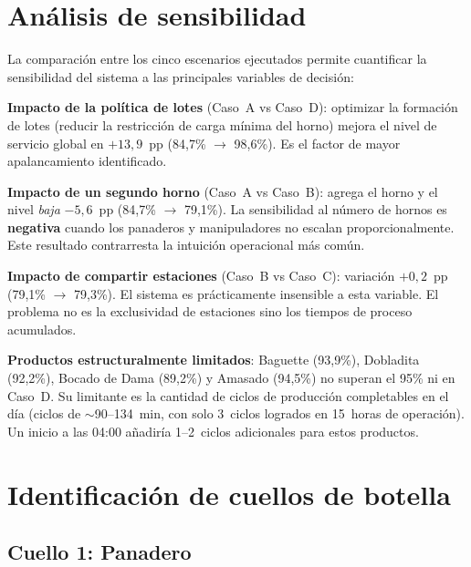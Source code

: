 \documentclass[12pt]{article}
\begin{document}
\newpage
\section{Análisis de sensibilidad}

La comparación entre los cinco escenarios ejecutados permite cuantificar la sensibilidad del sistema a las principales variables de decisión:

\medskip
\noindent\textbf{Impacto de la política de lotes} (Caso~A vs Caso~D): optimizar la formación de lotes (reducir la restricción de carga mínima del horno) mejora el nivel de servicio global en $+13,9$~pp (84,7\% $\to$ 98,6\%). Es el factor de mayor apalancamiento identificado.

\medskip
\noindent\textbf{Impacto de un segundo horno} (Caso~A vs Caso~B): agrega el horno y el nivel \emph{baja} $-5,6$~pp (84,7\% $\to$ 79,1\%). La sensibilidad al número de hornos es \textbf{negativa} cuando los panaderos y manipuladores no escalan proporcionalmente. Este resultado contrarresta la intuición operacional más común.

\medskip
\noindent\textbf{Impacto de compartir estaciones} (Caso~B vs Caso~C): variación $+0,2$~pp (79,1\% $\to$ 79,3\%). El sistema es prácticamente insensible a esta variable. El problema no es la exclusividad de estaciones sino los tiempos de proceso acumulados.

\medskip
\noindent\textbf{Productos estructuralmente limitados}: Baguette (93,9\%), Dobladita (92,2\%), Bocado de Dama (89,2\%) y Amasado (94,5\%) no superan el 95\% ni en Caso~D. Su limitante es la cantidad de ciclos de producción completables en el día (ciclos de $\sim$90--134~min, con solo 3~ciclos logrados en 15~horas de operación). Un inicio a las 04:00 añadiría 1--2~ciclos adicionales para estos productos.

\newpage
\section{Identificación de cuellos de botella}

\subsection{Cuello 1: Panadero}
\end{document}
